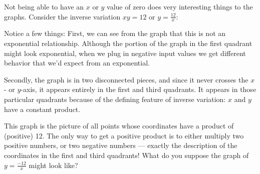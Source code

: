 Not being able to have an $x$ or $y$ value of zero does very interesting things to the graphs. Consider the inverse variation $xy=12$ or $y = \frac{12}{x}$:

\begin{center}
\end{center}


Notice a few things: First, we can see from the graph that this is not an exponential relationship. Although the portion of the graph in the first quadrant might look exponential, when we plug in negative input values we get different behavior that we'd expect from an exponential.

Secondly, the graph is in two disconnected pieces, and since it never crosses the $x$- or $y$-axis, it appears entirely in the first and third quadrants. It appears in those particular quadrants because of the defining feature of inverse variation: $x$ and $y$ have a constant product.

This graph is the picture of all points whose coordinates have a product of (positive) 12. The only way to get a positive product is to either multiply two positive numbers, or two negative numbers --- exactly the description of the coordinates in the first and third quadrants! What do you suppose the graph of $y=\frac{-12}{x}$ might look like?

